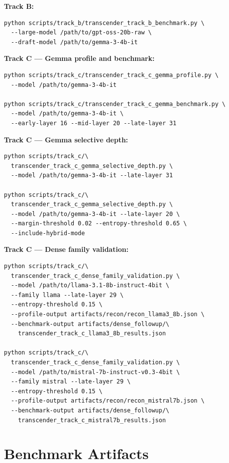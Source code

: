 \documentclass[11pt]{article}
\begin{document}
\noindent\textbf{Track B:}
{\small
\begin{verbatim}
python scripts/track_b/transcender_track_b_benchmark.py \
  --large-model /path/to/gpt-oss-20b-raw \
  --draft-model /path/to/gemma-3-4b-it
\end{verbatim}
}

\noindent\textbf{Track C --- Gemma profile and benchmark:}
{\small
\begin{verbatim}
python scripts/track_c/transcender_track_c_gemma_profile.py \
  --model /path/to/gemma-3-4b-it

python scripts/track_c/transcender_track_c_gemma_benchmark.py \
  --model /path/to/gemma-3-4b-it \
  --early-layer 16 --mid-layer 20 --late-layer 31
\end{verbatim}
}

\noindent\textbf{Track C --- Gemma selective depth:}
{\small
\begin{verbatim}
python scripts/track_c/\
  transcender_track_c_gemma_selective_depth.py \
  --model /path/to/gemma-3-4b-it --late-layer 31

python scripts/track_c/\
  transcender_track_c_gemma_selective_depth.py \
  --model /path/to/gemma-3-4b-it --late-layer 20 \
  --margin-threshold 0.02 --entropy-threshold 0.65 \
  --include-hybrid-mode
\end{verbatim}
}

\noindent\textbf{Track C --- Dense family validation:}
{\small
\begin{verbatim}
python scripts/track_c/\
  transcender_track_c_dense_family_validation.py \
  --model /path/to/llama-3.1-8b-instruct-4bit \
  --family llama --late-layer 29 \
  --entropy-threshold 0.15 \
  --profile-output artifacts/recon/recon_llama3_8b.json \
  --benchmark-output artifacts/dense_followup/\
    transcender_track_c_llama3_8b_results.json

python scripts/track_c/\
  transcender_track_c_dense_family_validation.py \
  --model /path/to/mistral-7b-instruct-v0.3-4bit \
  --family mistral --late-layer 29 \
  --entropy-threshold 0.15 \
  --profile-output artifacts/recon/recon_mistral7b.json \
  --benchmark-output artifacts/dense_followup/\
    transcender_track_c_mistral7b_results.json
\end{verbatim}
}

\section{Benchmark Artifacts}
\label{app:artifacts}
\end{document}
